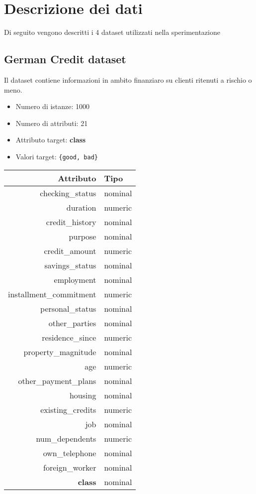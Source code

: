 \chapter{Descrizione dei dati}
\label{ch:data}

Di seguito vengono descritti i 4 dataset utilizzati nella sperimentazione

\section{German Credit dataset}
Il dataset contiene informazioni in ambito finanziaro su clienti ritenuti a rischio o meno.

\begin{itemize}
	\item Numero di istanze: 1000
	\item Numero di attributi: 21
	\item Attributo target: \textbf{class}
	\item Valori target: \texttt{\{good, bad\}}
\end{itemize}

\begin{table}[!htb]
	\centering
	\begin{tabular}{|r|l|}
		\hline
		Attributo & Tipo \\ 
		\hline
		checking\_status & nominal \\ 
		duration & numeric \\ 
		credit\_history & nominal \\ 
		purpose & nominal \\ 
		credit\_amount & numeric \\ 
		savings\_status & nominal \\ 
		employment & nominal \\ 
		installment\_commitment & numeric \\ 
		personal\_status & nominal \\ 
		other\_parties & nominal \\ 
		residence\_since & numeric \\ 
		property\_magnitude & nominal \\ 
		age & numeric \\ 
		other\_payment\_plans & nominal \\ 
		housing & nominal \\ 
		existing\_credits & numeric \\ 
		job & nominal \\ 
		num\_dependents & numeric \\ 
		own\_telephone & nominal \\ 
		foreign\_worker & nominal \\ 
		\textbf{class} & nominal \\ 
		\hline
	\end{tabular}
\end{table}

